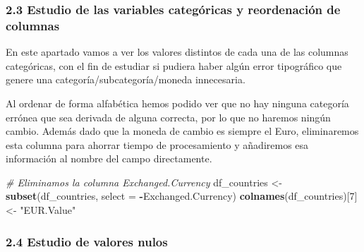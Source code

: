 \documentclass[
]{article}
\newenvironment{Shaded}{\begin{snugshade}}{\end{snugshade}}
\newcommand{\AttributeTok}[1]{\textcolor[rgb]{0.13,0.29,0.53}{#1}}
\newcommand{\CommentTok}[1]{\textcolor[rgb]{0.56,0.35,0.01}{\textit{#1}}}
\newcommand{\DecValTok}[1]{\textcolor[rgb]{0.00,0.00,0.81}{#1}}
\newcommand{\FunctionTok}[1]{\textcolor[rgb]{0.13,0.29,0.53}{\textbf{#1}}}
\newcommand{\NormalTok}[1]{#1}
\newcommand{\OtherTok}[1]{\textcolor[rgb]{0.56,0.35,0.01}{#1}}
\newcommand{\SpecialCharTok}[1]{\textcolor[rgb]{0.81,0.36,0.00}{\textbf{#1}}}
\newcommand{\StringTok}[1]{\textcolor[rgb]{0.31,0.60,0.02}{#1}}
\begin{document}
\hypertarget{estudio-de-las-variables-categuxf3ricas-y-reordenaciuxf3n-de-columnas}{%
\subsubsection{2.3 Estudio de las variables categóricas y reordenación
de
columnas}\label{estudio-de-las-variables-categuxf3ricas-y-reordenaciuxf3n-de-columnas}}

En este apartado vamos a ver los valores distintos de cada una de las
columnas categóricas, con el fin de estudiar si pudiera haber algún
error tipográfico que genere una categoría/subcategoría/moneda
innecesaria.

\begin{Shaded}
\end{Shaded}

Al ordenar de forma alfabética hemos podido ver que no hay ninguna
categoría errónea que sea derivada de alguna correcta, por lo que no
haremos ningún cambio. Además dado que la moneda de cambio es siempre el
Euro, eliminaremos esta columna para ahorrar tiempo de procesamiento y
añadiremos esa información al nombre del campo directamente.

\begin{Shaded}
\begin{Highlighting}[]
\CommentTok{\# Eliminamos la columna Exchanged.Currency}
\NormalTok{df\_countries }\OtherTok{\textless{}{-}} \FunctionTok{subset}\NormalTok{(df\_countries, }\AttributeTok{select =} \SpecialCharTok{{-}}\NormalTok{Exchanged.Currency)}
\FunctionTok{colnames}\NormalTok{(df\_countries)[}\DecValTok{7}\NormalTok{] }\OtherTok{\textless{}{-}} \StringTok{"EUR.Value"}
\end{Highlighting}
\end{Shaded}

\hypertarget{estudio-de-valores-nulos}{%
\subsubsection{2.4 Estudio de valores
nulos}\label{estudio-de-valores-nulos}}
\end{document}
